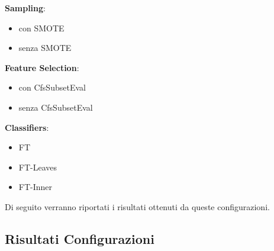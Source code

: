 %
%
%
\vspace{0.5cm}
\textbf{Sampling}:
\begin{itemize}
	\item con SMOTE
	\item senza SMOTE
\end{itemize}
\vspace{0.5cm}
\textbf{Feature Selection}:
\begin{itemize}
	\item con CfsSubsetEval
	\item senza CfsSubsetEval
\end{itemize}
\vspace{0.5cm}
\textbf{Classifiers}:
\begin{itemize}
	\item FT
	\item FT-Leaves
	\item FT-Inner
\end{itemize}

Di seguito verranno riportati i risultati ottenuti da queste configurazioni.
\pagebreak 
\subsection{Risultati Configurazioni}
